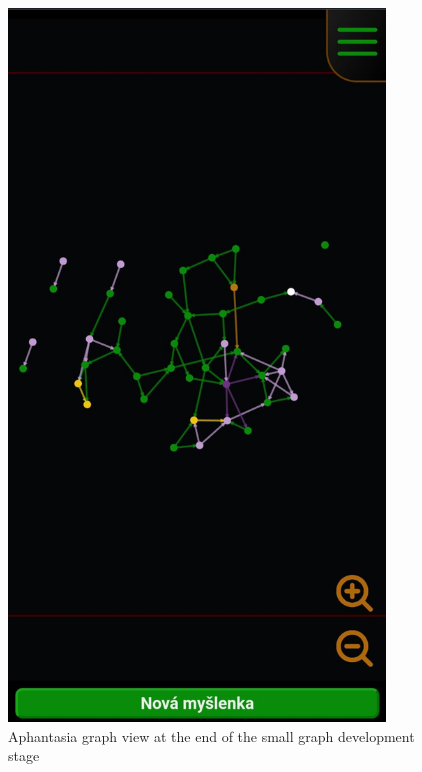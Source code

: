 \begin{figure}[p]\centering
    \includegraphics[width=100mm, keepaspectratio]{img/afantazie_first_stage_done.jpg}
    \caption{Aphantasia graph view at the end of the small graph development stage}
    \label{obr:afantazie_selfie}
\end{figure}

